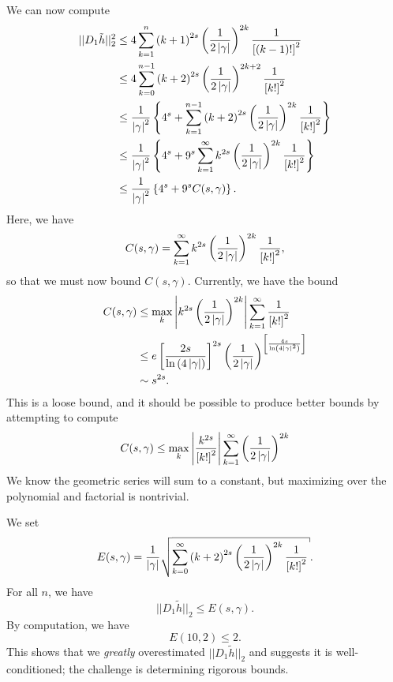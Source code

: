 We can now compute
%
\begin{align}
    ||D_{1}\tilde{h}||_{2}^{2}
        &\le 4 \sum_{k=1}^{n} \left( k+1 \right)^{2s}
        \left( \frac{1}{2\left| \gamma \right|} \right)^{2k}\frac{1}{\left[ (k-1)! \right]^{2}}
        \nonumber\\
    &\le 4 \sum_{k=0}^{n-1} \left( k+2 \right)^{2s}
        \left( \frac{1}{2\left| \gamma \right|} \right)^{2k+2}\frac{1}{\left[ k! \right]^{2}}
        \nonumber\\
    &\le \frac{1}{\left| \gamma \right|^{2}}\left\{ 
        4^{s} + \sum_{k=1}^{n-1}\left( k+2 \right)^{2s}
        \left( \frac{1}{2\left| \gamma \right|} \right)^{2k}\frac{1}{\left[ k! \right]^{2}} \right\}
        \nonumber\\
    &\le \frac{1}{\left| \gamma \right|^{2}}\left\{ 
        4^{s} + 9^{s}\sum_{k=1}^{\infty}k^{2s}
        \left( \frac{1}{2\left| \gamma \right|} \right)^{2k}\frac{1}{\left[ k! \right]^{2}} \right\}
        \nonumber\\
    &\le \frac{1}{\left| \gamma \right|^{2}}\left\{ 
        4^{s} + 9^{s}C(s,\gamma) \right\}.
\end{align}
%
Here, we have
%
\begin{equation}
    C(s,\gamma) = \sum_{k=1}^{\infty}k^{2s}
    \left( \frac{1}{2\left| \gamma \right|} \right)^{2k}\frac{1}{\left[ k! \right]^{2}},
\end{equation}
%
so that we must now bound $C(s,\gamma)$.
Currently, we have the bound
%
\begin{align}
    C(s,\gamma) &\le \max_{k}\left| k^{2s}\left( \frac{1}{2\left| \gamma \right|} \right)^{2k} \right|
        \sum_{k=1}^{\infty} \frac{1}{\left[ k! \right]^{2}}
        \nonumber\\
    &\le e\left[ \frac{2s}{\ln\left( 4\left| \gamma \right| \right)} \right]^{2s}
        \left( \frac{1}{2\left| \gamma \right|} \right)^{
            \left[ \frac{4s}{\ln\left( 4\left| \gamma \right|^{2} \right)} \right]} \nonumber\\
    &\sim s^{2s}.
\end{align}
%
This is a loose bound, and it should be possible to produce better bounds
by attempting to compute
%
\begin{equation}
    C(s,\gamma) \le \max_{k}\left| \frac{k^{2s}}{\left[ k! \right]^{2}} \right|
        \sum_{k=1}^{\infty} \left( \frac{1}{2\left| \gamma \right|} \right)^{2k}
\end{equation}
%
We know the geometric series will sum to a constant, but maximizing
over the polynomial and factorial is nontrivial.

We set
%
\begin{equation}
    E(s,\gamma) = \frac{1}{\abs{\gamma}} \sqrt{
        \sum_{k=0}^{\infty}\parens{k+2}^{2s}
    \parens{\frac{1}{2\abs{\gamma}}}^{2k}\frac{1}{\brackets{k!}^{2}}}.
\end{equation}
%
For all $n$, we have
%
\begin{equation}
    ||D_{1}\tilde{h}||_{2} \le E(s,\gamma).
\end{equation}
%
By computation, we have
%
\begin{equation}
    E(10,2) \le 2.
\end{equation}
%
This shows that we \emph{greatly} overestimated $||D_{1}\tilde{h}||_{2}$
and suggests it is well-conditioned; the challenge is determining
rigorous bounds.

